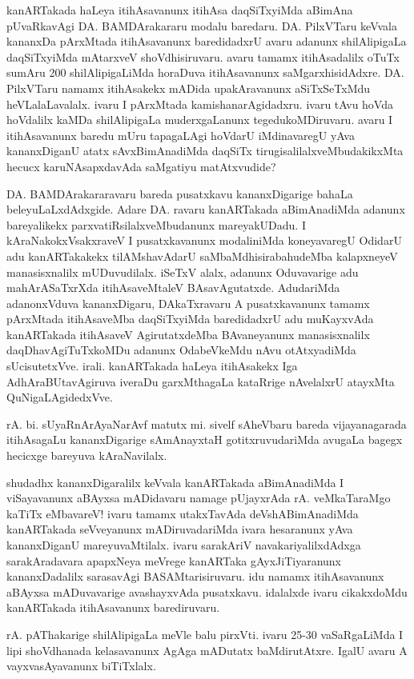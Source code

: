 \documentclass[11pt,a4size]{article}
\begin{document}
kanARTakada haLeya itihAsavanunx itihAsa daqSiTxyiMda aBimAna
pUvaRkavAgi DA. BAMDArakararu modalu baredaru. DA. PilxVTaru keVvala
kananxDa pArxMtada itihAsavanunx baredidadxrU avaru adanunx
shilAlipigaLa daqSiTxyiMda mAtarxveV shoVdhisiruvaru. avaru tamamx
itihAsadalilx oTuTx sumAru 200 shilAlipigaLiMda horaDuva itihAsavanunx
saMgarxhisidAdxre. DA. PilxVTaru namamx itihAsakekx mADida
upakAravanunx aSiTxSeTxMdu heVLalaLavalalx. ivaru I pArxMtada
kamishanarAgidadxru. ivaru tAvu hoVda hoVdalilx kaMDa shilAlipigaLa
muderxgaLanunx tegedukoMDiruvaru. avaru I itihAsavanunx baredu mUru
tapagaLAgi hoVdarU iMdinavaregU yAva kananxDiganU atatx
sAvxBimAnadiMda daqSiTx tirugisalilalxveMbudakikxMta hecucx
karuNAsapxdavAda saMgatiyu matAtxvudide?

DA. BAMDArakararavaru bareda pusatxkavu kananxDigarige bahaLa
beleyuLaLxdAdxgide. Adare DA. ravaru kanARTakada aBimAnadiMda adanunx
bareyalikekx parxvatiRsilalxveMbudanunx mareyakUDadu. I
kAraNakokxVsakxraveV I pusatxkavanunx modaliniMda koneyavaregU OdidarU
adu kanARTakakekx tilAMshavAdarU saMbaMdhisirabahudeMba kalapxneyeV
manasisxnalilx mUDuvudilalx. iSeTxV alalx, adanunx Oduvavarige adu
mahArASaTxrXda itihAsaveMtaleV BAsavAgutatxde. AdudariMda adanonxVduva
kananxDigaru, DAkaTxravaru A pusatxkavanunx tamamx pArxMtada
itihAsaveMba daqSiTxyiMda baredidadxrU adu muKayxvAda kanARTakada
itihAsaveV AgirutatxdeMba BAvaneyanunx manasisxnalilx
daqDhavAgiTuTxkoMDu adanunx OdabeVkeMdu nAvu otAtxyadiMda
sUcisutetxVve. irali. kanARTakada haLeya itihAsakekx Iga
AdhAraBUtavAgiruva iveraDu garxMthagaLa kataRrige nAvelalxrU atayxMta
QuNigaLAgidedxVve.

rA. bi. sUyaRnArAyaNarAvf matutx mi. sivelf sAheVbaru bareda
vijayanagarada itihAsagaLu kananxDigarige sAmAnayxtaH
gotitxruvudariMda avugaLa bagegx hecicxge bareyuva kAraNavilalx.

shudadhx kananxDigaralilx keVvala kanARTakada aBimAnadiMda I
viSayavanunx aBAyxsa mADidavaru namage pUjayxrAda rA. veMkaTaraMgo
kaTiTx eMbavareV! ivaru tamamx utakxTavAda deVshABimAnadiMda
kanARTakada seVveyanunx mADiruvadariMda ivara hesaranunx yAva
kananxDiganU mareyuvaMtilalx. ivaru sarakAriV navakariyalilxdAdxga
sarakAradavara apapxNeya meVrege kanARTaka gAyxJiTiyaranunx
kananxDadalilx sarasavAgi BASAMtarisiruvaru. idu namamx itihAsavanunx
aBAyxsa mADuvavarige avashayxvAda pusatxkavu. idalalxde ivaru
cikakxdoMdu kanARTakada itihAsavanunx barediruvaru.

rA. pAThakarige shilAlipigaLa meVle balu pirxVti. ivaru 25-30
vaSaRgaLiMda I lipi shoVdhanada kelasavanunx AgAga mADutatx
baMdirutAtxre. IgalU avaru A vayxvasAyavanunx biTiTxlalx.
\end{document}
